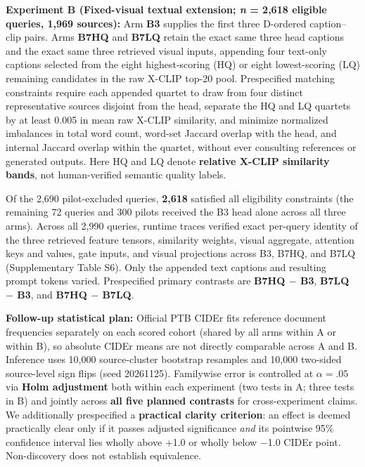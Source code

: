 \documentclass[11pt,a4paper]{article}
\begin{document}
\textbf{Experiment B (Fixed-visual textual extension; \emph{n} = 2,618 eligible queries, 1,969 sources):} Arm \textbf{B3} supplies the first three D-ordered caption--clip pairs. Arms \textbf{B7HQ} and \textbf{B7LQ} retain the exact same three head captions and the exact same three retrieved visual inputs, appending four text-only captions selected from the eight highest-scoring (HQ) or eight lowest-scoring (LQ) remaining candidates in the raw X-CLIP top-20 pool. Prespecified matching constraints require each appended quartet to draw from four distinct representative sources disjoint from the head, separate the HQ and LQ quartets by at least 0.005 in mean raw X-CLIP similarity, and minimize normalized imbalances in total word count, word-set Jaccard overlap with the head, and internal Jaccard overlap within the quartet, without ever consulting references or generated outputs. Here HQ and LQ denote \textbf{relative X-CLIP similarity bands}, not human-verified semantic quality labels.

Of the 2,690 pilot-excluded queries, \textbf{2,618} satisfied all eligibility constraints (the remaining 72 queries and 300 pilots received the B3 head alone across all three arms). Across all 2,990 queries, runtime traces verified exact per-query identity of the three retrieved feature tensors, similarity weights, visual aggregate, attention keys and values, gate inputs, and visual projections across B3, B7HQ, and B7LQ (Supplementary Table S6). Only the appended text captions and resulting prompt tokens varied. Prespecified primary contrasts are \textbf{B7HQ $-$ B3}, \textbf{B7LQ $-$ B3}, and \textbf{B7HQ $-$ B7LQ}.

\textbf{Follow-up statistical plan:} Official PTB CIDEr fits reference document frequencies separately on each scored cohort (shared by all arms within A or within B), so absolute CIDEr means are not directly comparable across A and B. Inference uses 10,000 source-cluster bootstrap resamples and 10,000 two-sided source-level sign flips (seed 20261125). Familywise error is controlled at $\alpha = .05$ via \textbf{Holm adjustment} both within each experiment (two tests in A; three tests in B) and jointly across \textbf{all five planned contrasts} for cross-experiment claims. We additionally prespecified a \textbf{practical clarity criterion}: an effect is deemed practically clear only if it passes adjusted significance \emph{and} its pointwise 95\% confidence interval lies wholly above +1.0 or wholly below $-$1.0 CIDEr point. Non-discovery does not establish equivalence.
\end{document}
